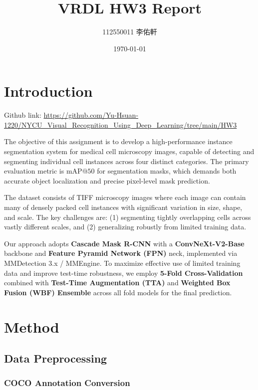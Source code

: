 \documentclass[a4paper]{article} %
\title{VRDL HW3 Report}
\author{112550011 李佑軒}
\date{\today}
\begin{document}
\maketitle %

\section{Introduction}

{\sloppy Github link: \url{https://github.com/Yu-Hsuan-1220/NYCU_Visual_Recognition_Using_Deep_Learning/tree/main/HW3}\par}

The objective of this assignment is to develop a high-performance instance segmentation system for medical cell microscopy images, capable of detecting and segmenting individual cell instances across four distinct categories. The primary evaluation metric is $\text{mAP}@50$ for segmentation masks, which demands both accurate object localization and precise pixel-level mask prediction.

The dataset consists of TIFF microscopy images where each image can contain many of densely packed cell instances with significant variation in size, shape, and scale. The key challenges are: (1) segmenting tightly overlapping cells across vastly different scales, and (2) generalizing robustly from limited training data.

Our approach adopts \textbf{Cascade Mask R-CNN} with a \textbf{ConvNeXt-V2-Base} backbone and \textbf{Feature Pyramid Network (FPN)} neck, implemented via MMDetection 3.x / MMEngine. To maximize effective use of limited training data and improve test-time robustness, we employ \textbf{5-Fold Cross-Validation} combined with \textbf{Test-Time Augmentation (TTA)} and \textbf{Weighted Box Fusion (WBF) Ensemble} across all fold models for the final prediction.

\section{Method}

\subsection{Data Preprocessing}


\subsubsection{COCO Annotation Conversion}
\end{document}
